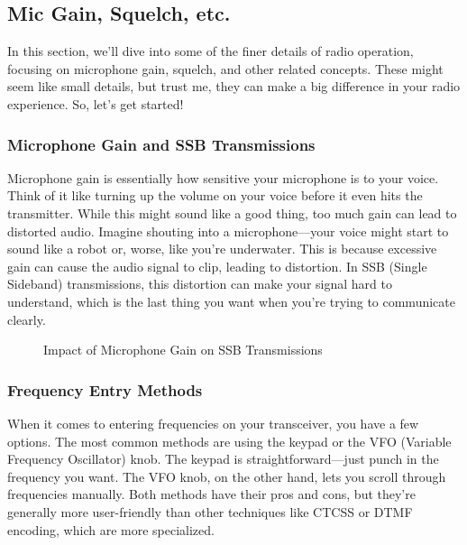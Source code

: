 \subsection{Mic Gain, Squelch, etc.}
\label{subsec:mic-squelch}

In this section, we'll dive into some of the finer details of radio operation, focusing on microphone gain, squelch, and other related concepts. These might seem like small details, but trust me, they can make a big difference in your radio experience. So, let's get started!

\subsubsection*{Microphone Gain and SSB Transmissions}

Microphone gain is essentially how sensitive your microphone is to your voice. Think of it like turning up the volume on your voice before it even hits the transmitter. While this might sound like a good thing, too much gain can lead to distorted audio. Imagine shouting into a microphone—your voice might start to sound like a robot or, worse, like you're underwater. This is because excessive gain can cause the audio signal to clip, leading to distortion. In SSB (Single Sideband) transmissions, this distortion can make your signal hard to understand, which is the last thing you want when you're trying to communicate clearly.

\begin{figure}[h]
    \centering
    \caption{Impact of Microphone Gain on SSB Transmissions}

    \label{fig:mic-gain-distortion}
\end{figure}

\subsubsection*{Frequency Entry Methods}

When it comes to entering frequencies on your transceiver, you have a few options. The most common methods are using the keypad or the VFO (Variable Frequency Oscillator) knob. The keypad is straightforward—just punch in the frequency you want. The VFO knob, on the other hand, lets you scroll through frequencies manually. Both methods have their pros and cons, but they’re generally more user-friendly than other techniques like CTCSS or DTMF encoding, which are more specialized.

